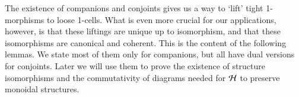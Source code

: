 
The existence of companions and conjoints gives us a way to `lift'
tight 1-morphisms to loose 1-cells.  What is even more crucial
for our applications, however, is that these liftings are unique up to
isomorphism, and that these isomorphisms are canonical and coherent.
This is the content of the following lemmas.  We state most of them
only for companions, but all have dual versions for conjoints. Later we will use them to prove the existence of structure isomorphisms and the commutativity of diagrams needed for $\mathcal{H}$ to preserve monoidal structures.

